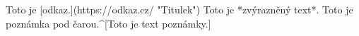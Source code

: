 


\def\markdownOptionInlineFootnotes{true}%
\def\markdownRendererEmphasis#1{{\it #1}}%
\let\markdownRendererFootnote=\fnote
\def\markdownRendererLink#1#2#3#4{%
  #1\fnote{Vizte \url{#3} (#4)}%
}%

\markdownBegin
Toto je [odkaz.](https://odkaz.cz/ "Titulek")
Toto je *zvýrazněný text*.
Toto je poznámka pod čarou.^[Toto je text poznámky.]
\markdownEnd
\bye
